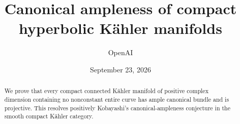 \documentclass[11pt]{article}
\title{Canonical ampleness of compact hyperbolic K\"ahler manifolds}
\author{OpenAI}
\date{September 23, 2026}
\theoremstyle{definition}
\theoremstyle{remark}
\numberwithin{equation}{section}
\begin{document}
\maketitle
\begin{abstract}
We prove that every compact connected K\"ahler manifold of positive
complex dimension containing no nonconstant entire curve has ample
canonical bundle and is projective. This resolves positively Kobayashi's
canonical-ampleness conjecture in the smooth compact K\"ahler category.
\end{abstract}










\appendix


\begingroup
\raggedright
\small


\endgroup
\end{document}
